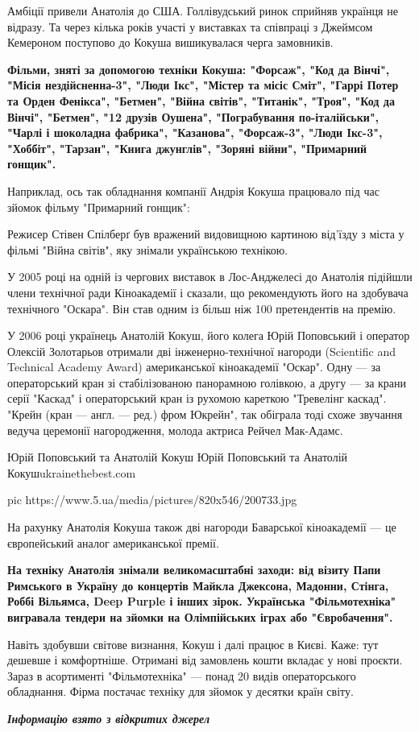 Амбіції привели Анатолія до США. Голлівудський ринок сприйняв українця не
відразу. Та через кілька років участі у виставках та співпраці з Джеймсом
Кемероном поступово до Кокуша вишикувалася черга замовників.

{\bfseries
Фільми, зняті за допомогою техніки Кокуша: "Форсаж", "Код да Вінчі",
"Місія нездійсненна-3", "Люди Ікс", "Містер та місіс Сміт", "Гаррі Потер
та Орден Фенікса", "Бетмен", "Війна світів", "Титанік", "Троя", "Код да
Вінчі", "Бетмен", "12 друзів Оушена", "Пограбування по-італійськи",
"Чарлі і шоколадна фабрика", "Казанова", "Форсаж-3", "Люди Ікс-3",
"Хоббіт", "Тарзан", "Книга джунглів", "Зоряні війни", "Примарний
гонщик".
}

Наприклад, ось так обладнання компанії Андрія Кокуша працювало під час
зйомок фільму "Примарний гонщик":

Режисер Стівен Спілберґ був вражений видовищною картиною від'їзду з міста
у фільмі "Війна світів", яку знімали українською технікою.

У 2005 році на одній із чергових виставок в Лос-Анджелесі до Анатолія
підійшли члени технічної ради Кіноакадемії і сказали, що рекомендують його
на здобувача технічного "Оскара". Він став одним із більш ніж 100
претендентів на премію.

У 2006 році українець Анатолій Кокуш, його колега Юрій Поповський і
оператор Олексій Золотарьов отримали дві інженерно-технічної нагороди
(Scientific and Technical Academy Award) американської кіноакадемії
"Оскар". Одну --- за операторський кран зі стабілізованою панорамною
голівкою, а другу --- за крани серії "Каскад" і операторський кран із
рухомою кареткою "Тревелінг каскад". "Крейн (кран --- англ. --- ред.) фром
Юкрейн", так обіграла тоді схоже звучання ведуча церемонії нагородження,
молода актриса Рейчел Мак-Адамс.

Юрій Поповський та Анатолій Кокуш  Юрій Поповський та Анатолій
Кокушukrainethebest.com

\ifcmt
pic https://www.5.ua/media/pictures/820x546/200733.jpg
\fi

На рахунку Анатолія Кокуша також дві нагороди Баварської кіноакадемії --- це
європейський аналог американської премії.

{\bfseries
На техніку Анатолія знімали великомасштабні заходи: від візиту Папи
Римського в Україну до концертів Майкла Джексона, Мадонни, Стінга, Роббі
Вільямса, Deep Purple і інших зірок. Українська "Фільмотехніка"
вигравала тендери на зйомки на Олімпійських іграх або "Євробачення".
}

Навіть здобувши світове визнання, Кокуш і далі працює в Києві. Каже: тут
дешевше і комфортніше. Отримані від замовлень кошти вкладає у нові
проєкти. Зараз в асортименті "Фільмотехніка" --- понад 20 видів
операторського обладнання. Фірма постачає техніку для зйомок у десятки
країн світу.

\textbf{\emph{Інформацію взято з відкритих джерел}}


